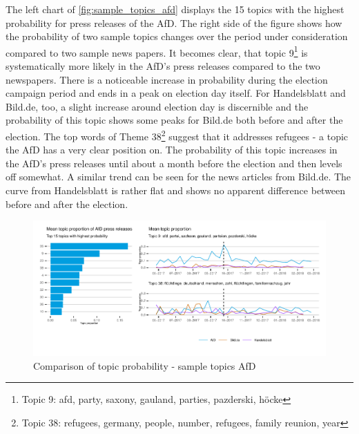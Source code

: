 \documentclass[
]{article}
\begin{document}
The left chart of \autoref{fig:sample_topics_afd} displays the 15 topics
with the highest probability for press releases of the AfD. The right
side of the figure shows how the probability of two sample topics
changes over the period under consideration compared to two sample news
papers. It becomes clear, that topic 9\footnote{Topic 9: afd, party,
  saxony, gauland, parties, pazderski, höcke} is systematically more
likely in the AfD's press releases compared to the two newspapers. There
is a noticeable increase in probability during the election campaign
period and ends in a peak on election day itself. For Handelsblatt and
Bild.de, too, a slight increase around election day is discernible and
the probability of this topic shows some peaks for Bild.de both before
and after the election. The top words of Theme 38\footnote{Topic 38:
  refugees, germany, people, number, refugees, family reunion, year}
suggest that it addresses refugees - a topic the AfD has a very clear
position on. The probability of this topic increases in the AfD's press
releases until about a month before the election and then levels off
somewhat. A similar trend can be seen for the news articles from
Bild.de. The curve from Handelsblatt is rather flat and shows no
apparent difference between before and after the election.

\begin{figure}

{\centering \includegraphics[width=1\linewidth]{main_text_files/figure-latex/Top AfD topics-1} 

}

\caption{Comparison of topic probability - sample topics AfD \label{fig:sample_topics_afd}}\label{fig:Top AfD topics}
\end{figure}
\end{document}
